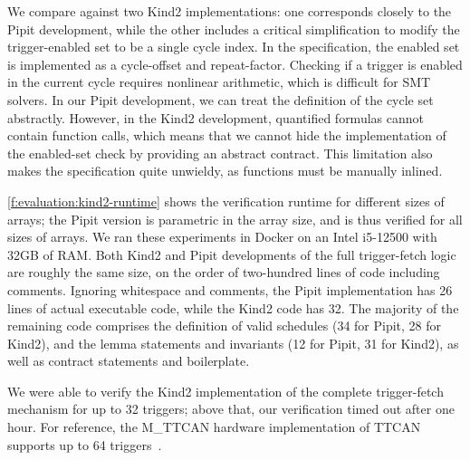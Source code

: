 We compare against two Kind2 implementations: one corresponds closely to the Pipit development, while the other includes a critical simplification to modify the trigger-enabled set to be a single cycle index.
In the specification, the enabled set is implemented as a cycle-offset and repeat-factor.
Checking if a trigger is enabled in the current cycle requires nonlinear arithmetic, which is difficult for SMT solvers.
In our Pipit development, we can treat the definition of the cycle set abstractly.
However, in the Kind2 development, quantified formulas cannot contain function calls, which means that we cannot hide the implementation of the enabled-set check by providing an abstract contract.
This limitation also makes the specification quite unwieldy, as functions must be manually inlined.

\autoref{f:evaluation:kind2-runtime} shows the verification runtime for different sizes of arrays; the Pipit version is parametric in the array size, and is thus verified for all sizes of arrays.
We ran these experiments in Docker on an Intel i5-12500 with 32GB of RAM.
Both Kind2 and Pipit developments of the full trigger-fetch logic are roughly the same size, on the order of two-hundred lines of code including comments.
Ignoring whitespace and comments, the Pipit implementation has 26 lines of actual executable code, while the Kind2 code has 32.
The majority of the remaining code comprises the definition of valid schedules (34 for Pipit, 28 for Kind2), and the lemma statements and invariants (12 for Pipit, 31 for Kind2), as well as contract statements and boilerplate.

We were able to verify the Kind2 implementation of the complete trigger-fetch mechanism for up to 32 triggers; above that, our verification timed out after one hour.
For reference, the M_TTCAN hardware implementation of TTCAN supports up to 64 triggers~\cite{bosch2019mttcan}.


